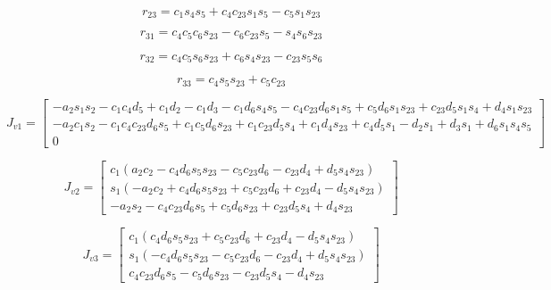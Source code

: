 \begin{equation}
r_{23} = c_{1} s_{4} s_{5} + c_{4} c_{23} s_{1} s_{5} - c_{5} s_{1} s_{23}
\end{equation}

\begin{equation}
r_{31} = c_{4} c_{5} c_{6} s_{23} - c_{6} c_{23} s_{5} - s_{4} s_{6} s_{23}
\end{equation}

\begin{equation}
r_{32} = c_{4} c_{5} s_{6} s_{23} + c_{6} s_{4} s_{23} - c_{23} s_{5} s_{6}
\end{equation}

\begin{equation}
r_{33} = c_{4} s_{5} s_{23} + c_{5} c_{23}
\end{equation}

\begin{equation}
J_{v1} = \left[\begin{matrix}- a_{2} s_{1} s_{2} - c_{1} c_{4} d_{5} + c_{1} d_{2} - c_{1} d_{3} - c_{1} d_{6} s_{4} s_{5} - c_{4} c_{23} d_{6} s_{1} s_{5} + c_{5} d_{6} s_{1} s_{23} + c_{23} d_{5} s_{1} s_{4} + d_{4} s_{1} s_{23}\\- a_{2} c_{1} s_{2} - c_{1} c_{4} c_{23} d_{6} s_{5} + c_{1} c_{5} d_{6} s_{23} + c_{1} c_{23} d_{5} s_{4} + c_{1} d_{4} s_{23} + c_{4} d_{5} s_{1} - d_{2} s_{1} + d_{3} s_{1} + d_{6} s_{1} s_{4} s_{5}\\0\end{matrix}\right]
\end{equation}

\begin{equation}
J_{v2} = \left[\begin{matrix}c_{1} \left(a_{2} c_{2} - c_{4} d_{6} s_{5} s_{23} - c_{5} c_{23} d_{6} - c_{23} d_{4} + d_{5} s_{4} s_{23}\right)\\s_{1} \left(- a_{2} c_{2} + c_{4} d_{6} s_{5} s_{23} + c_{5} c_{23} d_{6} + c_{23} d_{4} - d_{5} s_{4} s_{23}\right)\\- a_{2} s_{2} - c_{4} c_{23} d_{6} s_{5} + c_{5} d_{6} s_{23} + c_{23} d_{5} s_{4} + d_{4} s_{23}\end{matrix}\right]
\end{equation}

\begin{equation}
J_{v3} = \left[\begin{matrix}c_{1} \left(c_{4} d_{6} s_{5} s_{23} + c_{5} c_{23} d_{6} + c_{23} d_{4} - d_{5} s_{4} s_{23}\right)\\s_{1} \left(- c_{4} d_{6} s_{5} s_{23} - c_{5} c_{23} d_{6} - c_{23} d_{4} + d_{5} s_{4} s_{23}\right)\\c_{4} c_{23} d_{6} s_{5} - c_{5} d_{6} s_{23} - c_{23} d_{5} s_{4} - d_{4} s_{23}\end{matrix}\right]
\end{equation}

